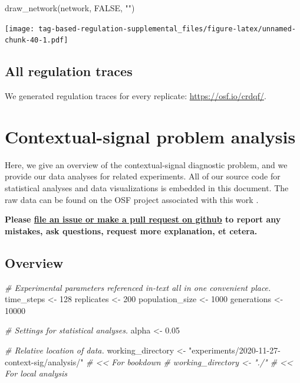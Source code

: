 \documentclass[
]{book}
\newenvironment{Shaded}{\begin{snugshade}}{\end{snugshade}}
\newcommand{\CommentTok}[1]{\textcolor[rgb]{0.56,0.35,0.01}{\textit{#1}}}
\newcommand{\ConstantTok}[1]{\textcolor[rgb]{0.00,0.00,0.00}{#1}}
\newcommand{\DecValTok}[1]{\textcolor[rgb]{0.00,0.00,0.81}{#1}}
\newcommand{\FloatTok}[1]{\textcolor[rgb]{0.00,0.00,0.81}{#1}}
\newcommand{\FunctionTok}[1]{\textcolor[rgb]{0.00,0.00,0.00}{#1}}
\newcommand{\NormalTok}[1]{#1}
\newcommand{\OtherTok}[1]{\textcolor[rgb]{0.56,0.35,0.01}{#1}}
\newcommand{\StringTok}[1]{\textcolor[rgb]{0.31,0.60,0.02}{#1}}
\begin{document}
\begin{Shaded}
\begin{Highlighting}[]
\FunctionTok{draw\_network}\NormalTok{(network, }\ConstantTok{FALSE}\NormalTok{, }\StringTok{""}\NormalTok{)}
\end{Highlighting}
\end{Shaded}

\texttt{[image: tag-based-regulation-supplemental\_files/figure-latex/unnamed-chunk-40-1.pdf]}

\hypertarget{all-regulation-traces}{%
\section{All regulation traces}\label{all-regulation-traces}}

We generated regulation traces for every replicate: \url{https://osf.io/crdqf/}.

\hypertarget{contextual-signal-problem-analysis}{%
\chapter{Contextual-signal problem analysis}\label{contextual-signal-problem-analysis}}

Here, we give an overview of the contextual-signal diagnostic problem, and we provide our data analyses for related experiments.
All of our source code for statistical analyses and data visualizations is embedded in this document.
The raw data can be found on the OSF project associated with this work \citep{Lalejini_Moreno_Ofria_Data_2020}.

\textbf{Please \href{https://github.com/amlalejini/Tag-based-Genetic-Regulation-for-LinearGP/issues}{file an issue or make a pull request on github} to report any mistakes, ask questions, request more explanation, et cetera.}

\hypertarget{overview-1}{%
\section{Overview}\label{overview-1}}

\begin{Shaded}
\begin{Highlighting}[]
\CommentTok{\# Experimental parameters referenced in{-}text all in one convenient place.}
\NormalTok{time\_steps }\OtherTok{\textless{}{-}} \DecValTok{128}
\NormalTok{replicates }\OtherTok{\textless{}{-}} \DecValTok{200}
\NormalTok{population\_size }\OtherTok{\textless{}{-}} \DecValTok{1000}
\NormalTok{generations }\OtherTok{\textless{}{-}} \DecValTok{10000}

\CommentTok{\# Settings for statistical analyses.}
\NormalTok{alpha }\OtherTok{\textless{}{-}} \FloatTok{0.05}

\CommentTok{\# Relative location of data.}
\NormalTok{working\_directory }\OtherTok{\textless{}{-}} \StringTok{"experiments/2020{-}11{-}27{-}context{-}sig/analysis/"} \CommentTok{\# \textless{}\textless{} For bookdown}
\CommentTok{\# working\_directory \textless{}{-} "./"                                         \# \textless{}\textless{} For local analysis}
\end{Highlighting}
\end{Shaded}
\end{document}
